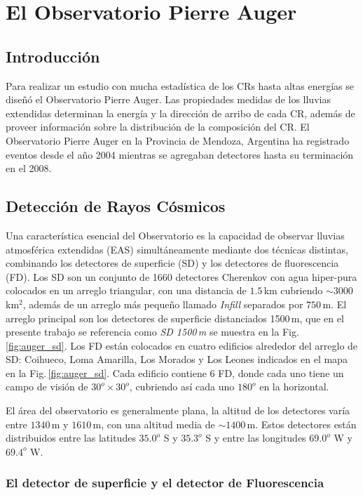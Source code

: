 \chapter{El Observatorio Pierre Auger}

\section{Introducción}

Para realizar un estudio con mucha estadística de los CRs hasta altas energías se diseñó el Observatorio Pierre Auger. Las propiedades medidas de los lluvias extendidas determinan la energía y la dirección de arribo de cada CR, además de proveer información sobre la distribución de la composición del CR. El Observatorio Pierre Auger en la Provincia de Mendoza, Argentina ha registrado eventos desde el año 2004 mientras se agregaban detectores hasta su terminación en el 2008.

\section{Detección de Rayos Cósmicos}

Una característica esencial del Observatorio es la capacidad de observar lluvias atmosférica extendidas (EAS) simultáneamente mediante dos técnicas distintas, combinando los detectores de superficie (SD) y los detectores de fluorescencia (FD). Los SD son un conjunto de 1660  detectores Cherenkov con agua hiper-pura colocados en un arreglo triangular, con una distancia de $1.5\,$km cubriendo $\sim3000\,$km$^2$, además de un arreglo más pequeño llamado \emph{Infill} separados por $750\,$m. El arreglo principal son los detectores de superficie distanciados 1500\,m, que en el presente trabajo se  referencia como \emph{SD 1500\,m} se muestra en la Fig.\,\ref{fig:auger_sd}. Los FD están colocados en cuatro edificios alrededor del arreglo de SD: Coihueco, Loma Amarilla, Los Morados y Los Leones indicados en el mapa en la Fig.\,\ref{fig:auger_sd}. Cada edificio contiene 6 FD, donde cada uno tiene un campo de visión de $30^o\times30^o$, cubriendo así cada uno $180^o$ en la horizontal.

El área del observatorio es generalmente plana, la altitud de los detectores varía entre $1340\,$m y $1610\,$m, con una altitud media de $\sim1400\,$m. Estos detectores están distribuidos entre las latitudes $35.0^o$ S y $35.3^o$ S y entre las longitudes $69.0^o$ W y $69.4^o$ W.


\subsection{ El detector de superficie y el detector de Fluorescencia}

